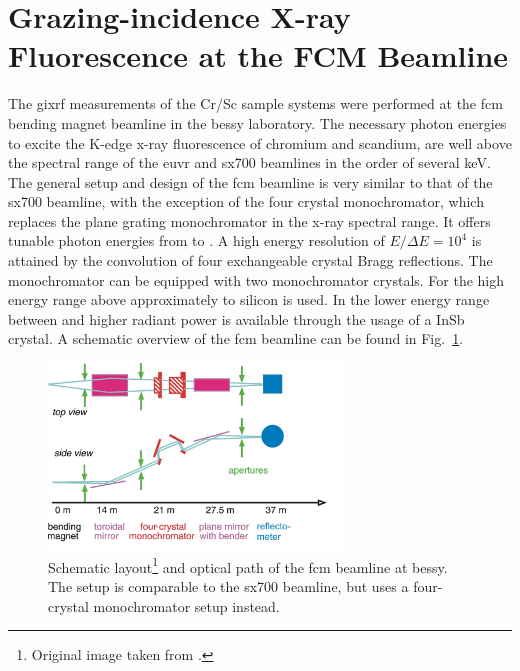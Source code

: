 \section{Grazing-incidence X-ray Fluorescence at the FCM Beamline} \label{ch_exp:sec_xrf_at_fcm}
The \gls{gixrf} measurements of the Cr/Sc sample systems were performed at the \gls{fcm} bending magnet beamline \cite{krumrey_design_1998} in the \gls{bessy} laboratory. The necessary photon energies to excite the K-edge x-ray fluorescence of chromium and scandium, are well above the spectral range of the \gls{euvr} and \gls{sx700} beamlines in the order of several \si{\kilo\electronvolt}. The general setup and design of the \gls{fcm} beamline is very similar to that of the \gls{sx700} beamline, with the exception of the four crystal monochromator, which replaces the plane grating monochromator in the x-ray spectral range. It offers tunable photon energies from  to . A high energy resolution of $E/\Delta E = 10^4$ is attained by the convolution of four exchangeable crystal Bragg reflections. The monochromator can be equipped with two monochromator crystals. For the high energy range above approximately  to  silicon is used. In the lower energy range between  and  higher radiant power is available through the usage of a InSb crystal. A schematic overview of the \gls{fcm} beamline can be found in Fig.~\ref{ch_exp:fig_fcm_scheme}.
\begin{figure}[htb]
        \includegraphics[width=0.7\textwidth]{img/FCMScheme.png}
        \caption[FCM beamline scheme.]{%
            Schematic layout\footnote{Original image taken from \textcite{krumrey_design_1998}.} and optical path of the \gls{fcm} beamline at \gls{bessy}. The setup is comparable to the \gls{sx700} beamline, but uses a four-crystal monochromator setup instead.}
        \label{ch_exp:fig_fcm_scheme}
\end{figure}

